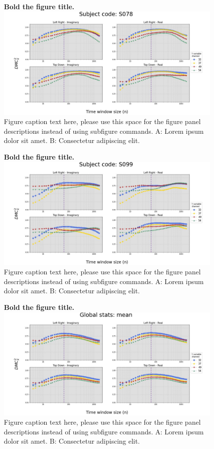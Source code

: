\documentclass[10pt,letterpaper]{article}
\begin{document}
\begin{figure}[!h]
    \caption{{\bf Bold the figure title.}
    \includegraphics[width=.9\textwidth]{../output/figs/stats/S078.jpg}
      Figure caption text here, please use this space for the figure panel descriptions instead of using subfigure commands. A: Lorem ipsum dolor sit amet. B: Consectetur adipiscing elit.}
    \label{fig78}
\end{figure}

\begin{figure}[!h]
    \caption{{\bf Bold the figure title.}
    \includegraphics[width=.9\textwidth]{../output/figs/stats/S099.jpg}
      Figure caption text here, please use this space for the figure panel descriptions instead of using subfigure commands. A: Lorem ipsum dolor sit amet. B: Consectetur adipiscing elit.}
    \label{fig99}
\end{figure}


\begin{figure}[!h]
    \caption{{\bf Bold the figure title.}
    \includegraphics[width=.9\textwidth]{../output/figs/global/mean.jpg}
      Figure caption text here, please use this space for the figure panel descriptions instead of using subfigure commands. A: Lorem ipsum dolor sit amet. B: Consectetur adipiscing elit.}
      \label{glob_mean}
\end{figure}
\end{document}
